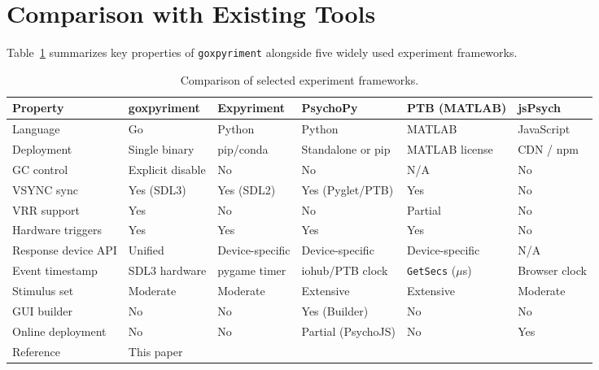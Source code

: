 \documentclass[jou,a4paper]{apa7}
\begin{document}
\section{Comparison with Existing Tools}\label{comparison-with-existing-tools}

Table~\ref{tab:comparison} summarizes key properties of \texttt{goxpyriment}
alongside five widely used experiment frameworks.

\begin{table}[tb]
\caption{Comparison of selected experiment frameworks.}
\label{tab:comparison}
\footnotesize
\begin{tabular}{@{}
  >{\raggedright\arraybackslash}p{}
  >{\raggedright\arraybackslash}p{}
  >{\raggedright\arraybackslash}p{}
  >{\raggedright\arraybackslash}p{}
  >{\raggedright\arraybackslash}p{}
  >{\raggedright\arraybackslash}p{}@{}}
\toprule
Property & goxpyriment & Expyriment & PsychoPy & PTB (MATLAB) & jsPsych \\
\midrule
Language        & Go           & Python        & Python            & MATLAB           & JavaScript \\
Deployment      & Single binary & pip/conda    & Standalone or pip & MATLAB license   & CDN / npm \\
GC control      & Explicit disable & No        & No                & N/A              & No \\
VSYNC sync      & Yes (SDL3)   & Yes (SDL2)    & Yes (Pyglet/PTB)  & Yes              & No \\
VRR support     & Yes          & No            & No                & Partial          & No \\
Hardware triggers & Yes        & Yes           & Yes               & Yes              & No \\
Response device API & Unified  & Device-specific & Device-specific & Device-specific & N/A \\
Event timestamp & SDL3 hardware & pygame timer & iohub/PTB clock  & \texttt{GetSecs} ($\mu$s) & Browser clock \\
Stimulus set    & Moderate     & Moderate      & Extensive         & Extensive        & Moderate \\
GUI builder     & No           & No            & Yes (Builder)     & No               & No \\
Online deployment & No         & No            & Partial (PsychoJS) & No              & Yes \\
Reference       & This paper   & \cite{krause2014} & \cite{peirce2019} & \cite{brainard1997} & \cite{deleeuw2023} \\
\bottomrule
\end{tabular}
\end{table}
\end{document}
